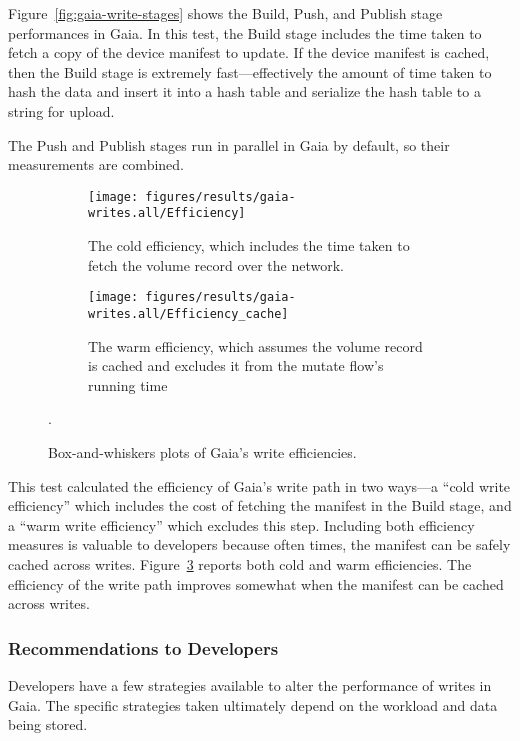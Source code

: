 Figure~\ref{fig:gaia-write-stages} shows the Build, Push, and Publish stage
performances in Gaia.  In this test, the Build stage includes
the time taken to fetch a copy of the device manifest to update.  If the device
manifest is cached, then the Build stage is extremely fast---effectively the amount of
time taken to hash the data and insert it into a hash table and serialize the
hash table to a string for upload.

The Push and Publish stages run in parallel in Gaia by default, so their
measurements are combined.

\begin{figure}[htp!]
   \centering
   \begin{subfigure}[b]{.8\textwidth}
      \texttt{[image: figures/results/gaia-writes.all/Efficiency]}
      \label{fig:gaia-read-getmanifest}
      \caption{The cold efficiency, which includes the time taken to fetch the
      volume record over the network.}
   \end{subfigure}
   \begin{subfigure}[b]{.8\textwidth}
      \texttt{[image: figures/results/gaia-writes.all/Efficiency\_cache]}
      \label{fig:gaia-read-discover}
      \caption{The warm efficiency, which assumes the volume record is cached
      and excludes it from the mutate flow's running time}
   \end{subfigure}
   \caption{Box-and-whiskers plots of Gaia's write efficiencies.}
   \label{fig:gaia-write-efficiencies}.
\end{figure}

This test calculated the efficiency of Gaia's write path in two ways---a ``cold
write efficiency'' which includes the cost of fetching the manifest in the Build
stage, and a ``warm write efficiency'' which excludes this step.  Including both
efficiency measures is valuable to developers because often times, the manifest
can be safely cached across writes.  Figure~\ref{fig:gaia-write-efficiencies}
reports both cold and warm efficiencies.  The efficiency of the write path
improves somewhat when the manifest can be cached across writes.

\subsubsection{Recommendations to Developers}

Developers have a few strategies available to alter the performance of writes in Gaia.
The specific strategies taken ultimately depend on the workload and data being
stored.


